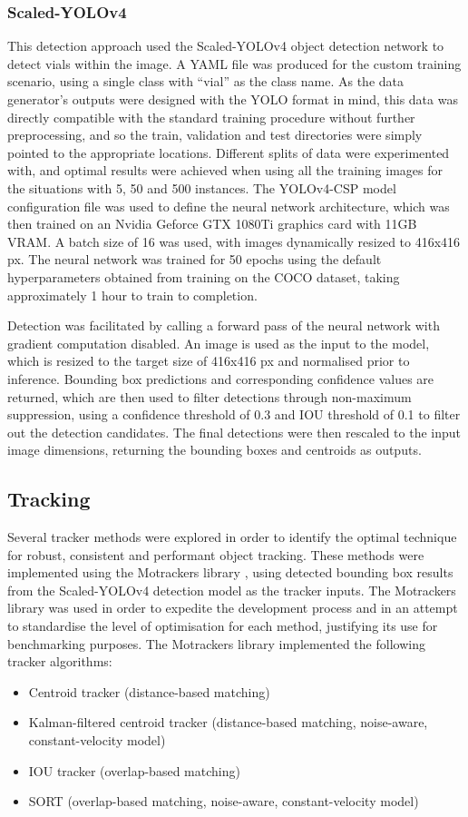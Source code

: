 \documentclass[10pt]{article}
\begin{document}
\subsubsection{Scaled-YOLOv4}
This detection approach used the Scaled-YOLOv4 object detection network to detect vials within the image. A YAML file was produced for the custom training scenario, using a single class with ``vial'' as the class name. As the data generator's outputs were designed with the YOLO format in mind, this data was directly compatible with the standard training procedure without further preprocessing, and so the train, validation and test directories were simply pointed to the appropriate locations. Different splits of data were experimented with, and optimal results were achieved when using all the training images for the situations with 5, 50 and 500 instances. The YOLOv4-CSP model configuration file was used to define the neural network architecture, which was then trained on an Nvidia Geforce GTX 1080Ti graphics card with 11GB VRAM. A batch size of 16 was used, with images dynamically resized to 416x416 px. The neural network was trained for 50 epochs using the default hyperparameters obtained from training on the COCO dataset, taking approximately 1 hour to train to completion.

Detection was facilitated by calling a forward pass of the neural network with gradient computation disabled. An image is used as the input to the model, which is resized to the target size of 416x416 px and normalised prior to inference. Bounding box predictions and corresponding confidence values are returned, which are then used to filter detections through non-maximum suppression, using a confidence threshold of 0.3 and IOU threshold of 0.1 to filter out the detection candidates. The final detections were then rescaled to the input image dimensions, returning the bounding boxes and centroids as outputs.

\subsection{Tracking}
Several tracker methods were explored in order to identify the optimal technique for robust, consistent and performant object tracking. These methods were implemented using the Motrackers library \cite{multiobjtracker_amd2018}, using detected bounding box results from the Scaled-YOLOv4 detection model as the tracker inputs. The Motrackers library was used in order to expedite the development process and in an attempt to standardise the level of optimisation for each method, justifying its use for benchmarking purposes. The Motrackers library implemented the following tracker algorithms:
\clearpage
\begin{itemize}
    \item Centroid tracker (distance-based matching)
    \item Kalman-filtered centroid tracker (distance-based matching, noise-aware,  constant-velocity model)
    \item IOU tracker (overlap-based matching)
    \item SORT (overlap-based matching, noise-aware, constant-velocity model)
\end{itemize}
\end{document}
